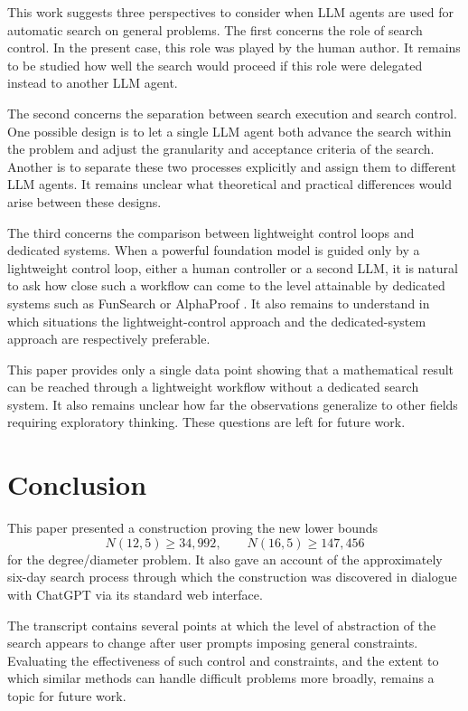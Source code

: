 \documentclass[11pt]{article}
\theoremstyle{definition}
\theoremstyle{remark}
\renewcommand{\_}{\textunderscore\allowbreak}
\begin{document}
This work suggests three perspectives to consider when LLM agents are
used for automatic search on general problems. The first concerns the
role of search control. In the present case, this role was played by the
human author. It remains to be studied how well the search would proceed
if this role were delegated instead to another LLM agent.

The second concerns the separation between search execution and search
control. One possible design is to let a single LLM agent both advance
the search within the problem and adjust the granularity and acceptance
criteria of the search. Another is to separate these two processes
explicitly and assign them to different LLM agents. It remains unclear
what theoretical and practical differences would arise between these
designs.

The third concerns the comparison between lightweight control loops and
dedicated systems. When a powerful foundation model is guided only by a
lightweight control loop, either a human controller or a second LLM, it
is natural to ask how close such a workflow can come to the level
attainable by dedicated systems such as FunSearch
\cite{RomeraParedes2024} or AlphaProof \cite{Hubert2026}. It also remains
to understand in which situations the lightweight-control approach and
the dedicated-system approach are respectively preferable.

This paper provides only a single data point showing that a mathematical
result can be reached through a lightweight workflow without a dedicated
search system. It also remains unclear how far the observations
generalize to other fields requiring exploratory thinking. These
questions are left for future work.


\section{Conclusion}\label{conclusion}

This paper presented a construction proving the new lower bounds \[
  N(12,5)\ge34{,}992,
  \qquad
  N(16,5)\ge147{,}456
\] for the degree/diameter problem. It also gave an account of the
approximately six-day search process through which the construction was
discovered in dialogue with ChatGPT via its standard web interface.

The transcript contains
several points at which the level of abstraction of the search appears
to change after user prompts imposing general constraints. Evaluating
the effectiveness of such control and constraints, and the extent to
which similar methods can handle difficult problems more broadly,
remains a topic for future work.
\end{document}
